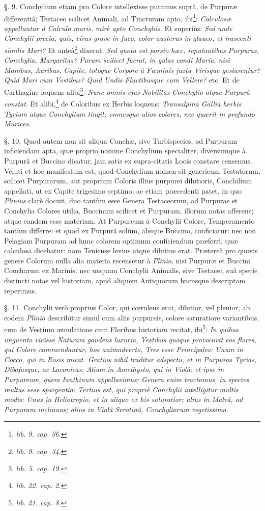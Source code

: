 \documentclass[a4paper, 11pt, oneside, polutonikogreek, german]{article}
\begin{document}
§. 9. Conchylium etiam pro Colore intellexisse putamus suprà, de Purpuræ differentiâ; Testaceo scilicet Animali, ad Tincturam apto, ibi\footnote{\emph{lib. 9. cap. 36.}}: \emph{Calculosæ appellantur à Calculo maris, mirè apto Conchyliis}. Et superiùs: \emph{Sed unde Conchylii precia, quis, virus grave in fuco, color austerus in glauco, et irascenti similis Mari?} Et anteà\footnote{\emph{lib. 9. cap. 34.}} dixerat: \emph{Sed quota est porsio hæc, reputantibus Purpuras, Conchylia, Margaritas? Parum scilicet fuerat, in gulas condi Maria, nisi Manibus, Auribus, Capite, totoque Corpore à Fœminis juxta Virisque gestarentur? Quid Mari cum Vestibus? Quid Undis Fluctibusque cum Vellere?} etc. Et de Carthagine loquens alibi\footnote{\emph{lib. 5. cap. 19.}}: \emph{Nunc omnis ejus Nobilitas Conchylio atque Purpurâ constat}. Et alibi,\footnote{\emph{lib. 22. cap. 2.}} de Coloribus ex Herbis loquens: \emph{Transalpina Gallia herbis Tyrium atque Conchylium tingit, omnesque alios colores, nec quærit in profundo Murices}.

§. 10. Quod autem non sit aliqua Conchæ, sive Turbispecies, ad Purpuram inficiendam apta, quæ proprio nomine Conchylium specialiter, diversumque à Purpurâ et Buccino dicatur; jam satis ex supra-citatis Locis constare censemus. Veluti et hoc manifestum est, quod Conchylium nomen sit genericum Testatorum, scilicet Purpurarum, aut proprium Coloris illius purpurei dilutioris, Conchilium appellati, ut ex Capite trigesimo septimo, ac etiam præcedenti patet, in quo \emph{Plinius} clarè docuit, duo tantùm esse Genera Testaceorum, ad Purpuras et Conchylia Colores utilia, Buccinum scilicet et Purpuram, illorum notas afferens; atque eandem esse materiam. At Purpureum à Conchylii Colore, Temperamento tantùm differre: et quod ex Purpurâ solùm, absque Buccino, conficiatur: nec non Pelagiam Purpuram ad hunc colorem optimum conficiendum præferri, quæ calculosa dicebatur: nam Teniense levius atque dilutius erat. Prætereà pro quovis genere Colorum nulla alia materia recensetur à \emph{Plinio}, nisi Purpuræ et Buccini Concharum ex Marinis; nec unquam Conchylii Animalis, sive Testacei, suâ specie distincti notas vel historiam, apud aliquem Antiquorum hucusque descriptam reperimus.

§. 11. Conchylii verò proprius Color, qui cœruleus erat, dilutior, vel plenior, ab eodem \emph{Plinio} describitur simul cum aliis purpureis, colore saturatiore variantibus, cum de Vestium æmulatione cum Floribus historiam recitat, ibi\footnote{\emph{lib. 21. cap. 8.}}: \emph{In quibus unguento vicisse Naturam gaudens luxuria, Vestibus quoque provocavit eos flores, qui Colore commendantur, hos animadverto, Tres esse Principales: Unum in Cocco, qui in Rosis micat. Gratius nihil traditur adspectu, et in Purpuras Tyrias, Dibafasque, ac Laconicas: Alium in Amethysto, qui in Violâ: et ipse in Purpureum, quem Ianthinum appellavimus; Genera enim tractamus, in species multas sese spargentia: Tertius est, qui propriè Conchylii intelligitur multis modis: Unus in Heliotropio, et in aliquo ex his saturatior; alius in Malvâ, ad Purpuram inclinans; alius in Violâ Serotinâ, Conchyliorum vegetissima}.
\end{document}
